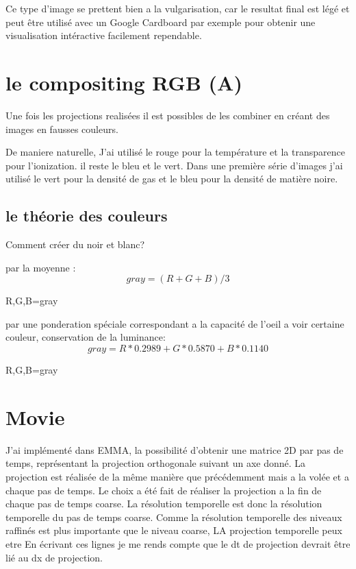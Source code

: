 Ce type d'image se prettent bien a la vulgarisation, car le resultat final est légé et peut être utilisé avec un Google Cardboard par exemple pour obtenir une visualisation intéractive facilement rependable.

\section{le compositing RGB (A)}
Une fois les projections realisées il est possibles de les combiner en créant des images en fausses couleurs.

De maniere naturelle, J'ai utilisé le rouge pour  la température et la transparence pour l'ionization.
il reste le bleu et le vert.
Dans une première série d'images j'ai utilisé le vert pour la densité de gas et le bleu pour la densité de matière noire.

\subsection{le théorie des couleurs}
Comment créer du noir et blanc?


par la moyenne :
\begin{equation}
gray= (R+G+B)/3
\end{equation}

R,G,B=gray


par une ponderation spéciale correspondant a la capacité de l'oeil a voir certaine couleur, conservation de la luminance:
\begin{equation}
gray = R*0.2989 + G*0.5870 +B*0.1140
\end{equation}

R,G,B=gray




\section{Movie}


J'ai implémenté dans EMMA, la possibilité d'obtenir une matrice 2D par pas de temps, représentant la projection orthogonale suivant un axe donné.
La projection est réalisée de la même manière que précédemment mais a la volée et a chaque pas de temps.
Le choix a été fait de réaliser la projection a la fin de chaque pas de temps coarse.
La résolution temporelle est donc la résolution temporelle du pas de temps coarse.
Comme la résolution temporelle des niveaux raffinés est plus importante que le niveau coarse, 
LA projection temporelle peux etre 
En écrivant ces lignes je me rends compte que le dt de projection devrait être lié au dx de projection. 

